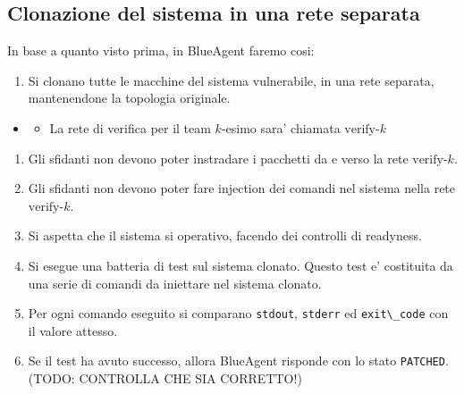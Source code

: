 \subsection{Clonazione del sistema in una rete
separata}\label{clonazione-del-sistema-in-una-rete-separata}

In base a quanto visto prima, in BlueAgent faremo cosi:

\begin{enumerate}
\def\labelenumi{\arabic{enumi}.}
\tightlist
\item
  Si clonano tutte le macchine del sistema vulnerabile, in una rete
  separata, mantenendone la topologia originale.
\end{enumerate}

\begin{itemize}
\tightlist
\item
  \begin{itemize}
  \tightlist
  \item
    La rete di verifica per il team \(k\)-esimo sara' chiamata
    \(\text{verify-}k\)
  \end{itemize}
\end{itemize}

\begin{enumerate}
\def\labelenumi{\arabic{enumi}.}
\setcounter{enumi}{1}
\tightlist
\item
  Gli sfidanti non devono poter instradare i pacchetti da e verso la
  rete \(\text{verify-}k\).
\item
  Gli sfidanti non devono poter fare injection dei comandi nel sistema
  nella rete \(\text{verify-}k\).
\item
  Si aspetta che il sistema si operativo, facendo dei controlli di
  readyness.
\item
  Si esegue una batteria di test sul sistema clonato. Questo test e'
  costituita da una serie di comandi da iniettare nel sistema clonato.
\item
  Per ogni comando eseguito si comparano
  \passthrough{\lstinline!stdout!}, \passthrough{\lstinline!stderr!} ed
  \passthrough{\lstinline!exit\_code!} con il valore attesso.
\item
  Se il test ha avuto successo, allora BlueAgent risponde con lo stato
  \passthrough{\lstinline!PATCHED!}. (TODO: CONTROLLA CHE SIA CORRETTO!)
\end{enumerate}
